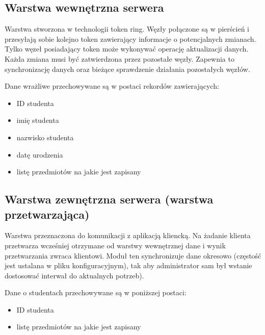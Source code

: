 \subsection*[Warstwa wewnętrzna serwera]{Warstwa wewnętrzna serwera}

\par{Warstwa stworzona w technologii token ring. Węzły połączone są w pierścień i przesyłają sobie kolejno token zawierający informacje o potencjalnych zmianach. Tylko węzeł posiadający token może wykonywać operację aktualizacji danych. Każda zmiana musi być zatwierdzona przez pozostałe węzły. Zapewnia to synchronizację danych oraz bieżące sprawdzenie działania pozostałych węzłów.}

\par{Dane wrażliwe przechowywane są w postaci rekordów zawierających:}

\begin{itemize}
\item ID studenta
\item imię studenta
\item nazwisko studenta
\item datę urodzenia
\item listę przedmiotów na jakie jest zapisany
\end{itemize}

\par{}

\subsection*[Warstwa zewnętrzna serwera]{Warstwa zewnętrzna serwera (warstwa przetwarzająca)}

\par{Warstwa przeznaczona do komunikacji z aplikacją kliencką. Na żadanie klienta przetwarza wcześniej otrzymane od warstwy wewnętrznej dane i wynik przetwarzania zwraca klientowi. Moduł ten synchronizuje dane okresowo (częstość jest ustalana w pliku konfiguracyjnym), tak aby administrator sam był wstanie dostosować interwał do aktualnych potrzeb). }

\par{Dane o studentach przechowywane są w poniższej postaci:}

\begin{itemize}
\item ID studenta
\item listę przedmiotów na jakie jest zapisany
\end{itemize}

